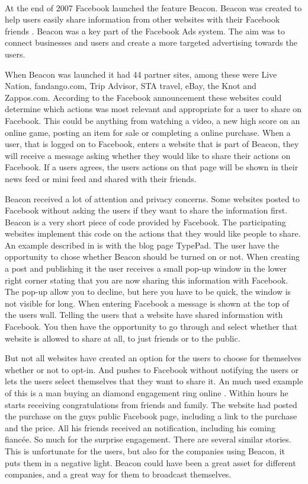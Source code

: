 \paragraph{}
At the end of 2007 Facebook launched the feature Beacon. Beacon was created to help users easily share information from other websites with their Facebook friends \cite{BeaconWebsites}. Beacon was a key part of the Facebook Ads system. The aim was to connect businesses and users and create a more targeted advertising towards the users. 

When Beacon was launched it had 44 partner sites, among these were Live Nation, fandango.com, Trip Advisor, STA travel, eBay, the Knot and Zappos.com. According to the Facebook announcement \cite{BeaconWebsites} these websites could determine which actions was most relevant and appropriate for a user to share on Facebook. This could be anything from watching a video, a new high score on an online game, posting an item for sale or completing a online purchase. When a user, that is logged on to Facebook, enters a website that is part of Beacon, they will receive a message asking whether they would like to share their actions on Facebook. If a users agrees, the users actions on that page will be shown in their news feed or mini feed and shared with their friends.  

Beacon received a lot of attention and privacy concerns. Some websites posted to Facebook without asking the users if they want to share the information first. Beacon is a very short piece of code provided by Facebook. The participating websites implement this code on the actions that they would like people to share. An example described in \cite{beaconMarketsPerspective} is with the blog page TypePad. The user have the opportunity to chose whether Beacon should be turned on or not. When creating a post and publishing it the user receives a small pop-up window in the lower right corner stating that you are now sharing this information with Facebook. The pop-up allow you to decline, but here you have to be quick, the window is not visible for long. When entering Facebook a message is shown at the top of the users wall. Telling the users that a website have shared information with Facebook. You then have the opportunity to go through and select whether that website is allowed to share at all, to just friends or to the public.  

But not all websites have created an option for the users to choose for themselves whether or not to opt-in. And pushes to Facebook without notifying the users or lets the users select themselves that they want to share it. An much used example of this is a man buying an diamond engagement ring online \cite{ring}. Within hours he starts receiving congratulations from friends and family. The website had posted the purchase on the guys public Facebook page, including a link to the purchase and the price. All his friends received an notification, including his coming fiancée. So much for the surprise engagement. There are several similar stories.  
This is unfortunate for the users, but also for the companies using Beacon, it puts them in a negative light. Beacon could have been a great asset for different companies, and a great way for them to broadcast themselves. 

